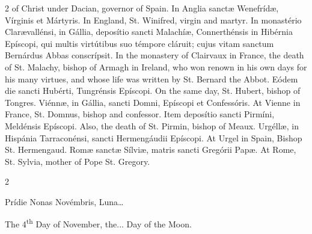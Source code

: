 \begin{paracol}{2}
 of Christ under Dacian, governor of Spain.
\switchcolumn*
{}
In Anglia sanctæ 
 Wenefrídæ, Vírginis et Mártyris.
\switchcolumn
{}
In England, St. Winifred, virgin and 
 martyr.
\switchcolumn*
{}
In monastério 
 Clarævallénsi, in Gállia, deposítio sancti Malachíæ, Connerthénsis in 
 Hibérnia Epíscopi, qui multis virtútibus suo témpore cláruit; cujus vitam 
 sanctum Bernárdus Abbas conscrípsit.
\switchcolumn
{}
In the monastery of Clairvaux in 
 France, the death of St. Malachy, bishop of Armagh in Ireland, who won 
 renown in his own days for his many virtues, and whose life was written by 
 St. Bernard the Abbot.
\switchcolumn*
{}
Eódem die sancti 
 Hubérti, Tungrénsis Epíscopi.
\switchcolumn
{}
On the same day, St. Hubert, bishop 
 of Tongres.
\switchcolumn*
{}
Viénnæ, in Gállia, 
 sancti Domni, Epíscopi et Confessóris.
\switchcolumn
{}
At Vienne in France, St. Domnus, 
 bishop and confessor.
\switchcolumn*
{}
Item deposítio sancti 
 Pirmíni, Meldénsis Epíscopi.
\switchcolumn
{}
Also, the death of St. Pirmin, 
 bishop of Meaux.
\switchcolumn*
{}
Urgéllæ, in Hispánia 
 Tarraconénsi, sancti Hermengáudii Epíscopi.
\switchcolumn
{}
At Urgel in Spain, Bishop St. 
 Hermengaud.
\switchcolumn*
{}
Romæ sanctæ Sílviæ, 
 matris sancti Gregórii Papæ.
\switchcolumn
{}
At Rome, St. Sylvia, mother of Pope St. Gregory.
\switchcolumn*
{}
\end{paracol}


\begin{paracol}{2}
\begin{center}{\color{gregoriocolor}Prídie Nonas 
 Novémbris, Luna\dots\ }\end{center}
\switchcolumn
{}
\begin{center}{\color{gregoriocolor}The 4\textsuperscript{th} Day of 
 November, the... Day of the Moon.}\end{center}
\end{paracol}

